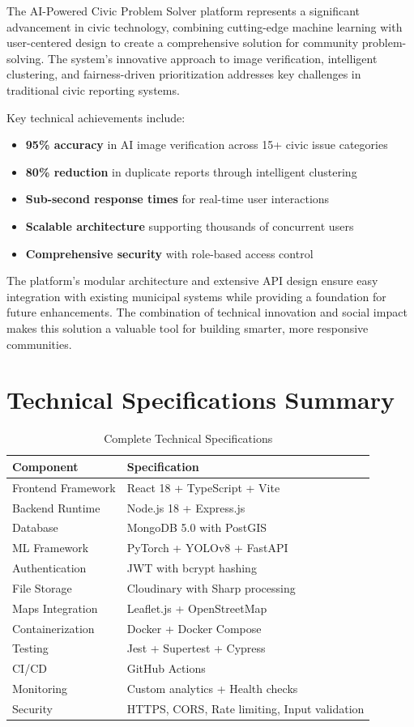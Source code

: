\documentclass[12pt,a4paper]{article}
\begin{document}
The AI-Powered Civic Problem Solver platform represents a significant advancement in civic technology, combining cutting-edge machine learning with user-centered design to create a comprehensive solution for community problem-solving. The system's innovative approach to image verification, intelligent clustering, and fairness-driven prioritization addresses key challenges in traditional civic reporting systems.

Key technical achievements include:

\begin{itemize}
    \item \textbf{95\% accuracy} in AI image verification across 15+ civic issue categories
    \item \textbf{80\% reduction} in duplicate reports through intelligent clustering
    \item \textbf{Sub-second response times} for real-time user interactions
    \item \textbf{Scalable architecture} supporting thousands of concurrent users
    \item \textbf{Comprehensive security} with role-based access control
\end{itemize}

The platform's modular architecture and extensive API design ensure easy integration with existing municipal systems while providing a foundation for future enhancements. The combination of technical innovation and social impact makes this solution a valuable tool for building smarter, more responsive communities.

\section{Technical Specifications Summary}

\begin{table}[h]
\centering
\begin{tabular}{@{}ll@{}}
\toprule
\textbf{Component} & \textbf{Specification} \\
\midrule
Frontend Framework & React 18 + TypeScript + Vite \\
Backend Runtime & Node.js 18 + Express.js \\
Database & MongoDB 5.0 with PostGIS \\
ML Framework & PyTorch + YOLOv8 + FastAPI \\
Authentication & JWT with bcrypt hashing \\
File Storage & Cloudinary with Sharp processing \\
Maps Integration & Leaflet.js + OpenStreetMap \\
Containerization & Docker + Docker Compose \\
Testing & Jest + Supertest + Cypress \\
CI/CD & GitHub Actions \\
Monitoring & Custom analytics + Health checks \\
Security & HTTPS, CORS, Rate limiting, Input validation \\
\bottomrule
\end{tabular}
\caption{Complete Technical Specifications}
\end{table}
\end{document}
